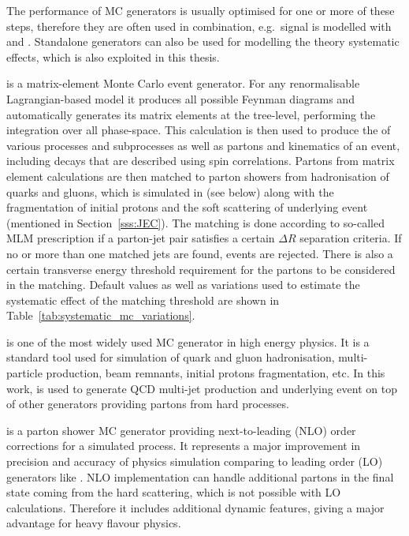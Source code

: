 The performance of MC generators is usually optimised for one or more of these steps, therefore they are often used
in combination, e.g.\ \ttbar signal is modelled with \MADGRAPH and \PYTHIA. Standalone generators can also be used for
modelling the theory systematic effects, which is also exploited in this thesis. %

\begin{description}[wide=\parindent, style=standard, labelsep=0pt]
\item [\MADGRAPH] \autocite{MadGraph} is a matrix-element Monte Carlo event generator. For any renormalisable
Lagrangian-based model it produces all possible Feynman diagrams and automatically generates its matrix elements at the
tree-level, performing the integration over all phase-space. This calculation is then used to produce the \xsect of
various processes and subprocesses as well as partons and kinematics of an event, including decays that are described
using spin correlations. Partons from matrix element calculations are then matched to parton showers from hadronisation
of quarks and gluons, which is simulated in \PYTHIA (see below) along with the fragmentation of initial protons and the
soft scattering of underlying event (mentioned in Section~\ref{sss:JEC}). The matching is done according to so-called
MLM prescription \autocite{MLM} if a parton-jet pair satisfies a certain $\Delta R$ separation criteria. If no or more
than one matched jets are found, events are rejected. There is also a certain transverse energy threshold requirement
for the partons to be considered in the matching. Default values as well as variations used to estimate the systematic
effect of the matching threshold are shown in Table~\ref{tab:systematic_mc_variations}.

\item [\PYTHIA] \autocite{Pythia,Pythia6.4} is one of the most widely used MC generator in high energy physics. It is a
standard tool used for simulation of quark and gluon hadronisation, multi-particle production, beam remnants, initial
protons fragmentation, etc. In this work, \PYTHIA is used to generate QCD multi-jet production and underlying event on
top of other generators providing partons from hard processes.

\item [\MCATNLO] \autocite{MCatNLO} is a parton shower MC generator providing next-to-leading (NLO) order corrections
for a simulated process. It represents a major improvement in precision and accuracy of physics simulation comparing to
leading order (LO) generators like \PYTHIA. NLO implementation can handle additional partons in the final state coming
from the hard scattering, which is not possible with LO calculations. Therefore it includes additional dynamic features,
giving a major advantage for heavy flavour physics.


\end{description}
